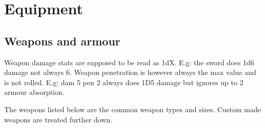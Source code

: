 

\cleardoublepage

\chapter*{Equipment}




\section*{Weapons and armour}

Weapon damage stats are supposed to be read as 1dX. E.g: the sword does 1d6 damage not always 6. Weapon penetration is however always the max value and is not rolled. E.g: dam 5 pen 2 always does 1D5 damage but ignores up to 2 armour absorption.

The weapons listed below are the common weapon types and sizes. Custom made weapons are treated further down.



%

